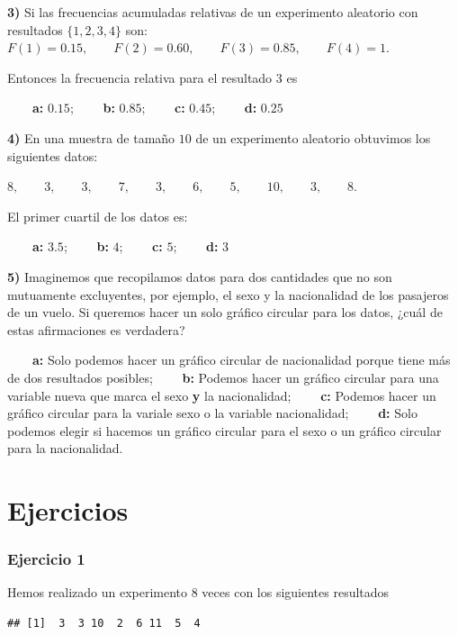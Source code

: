 \documentclass[
]{book}
\begin{document}
\textbf{3)} Si las frecuencias acumuladas relativas de un experimento aleatorio con resultados \(\{1,2,3,4\}\) son: \(F(1)=0.15, \qquad F(2)=0.60, \qquad F(3)=0.85, \qquad F(4)=1\).

Entonces la frecuencia relativa para el resultado \(3\) es

\textbf{\(\qquad\)a:} \(0.15\); \textbf{\(\qquad\)b:} \(0.85\); \textbf{\(\qquad\)c:} \(0.45\); \textbf{\(\qquad\)d:} \(0.25\)

\textbf{4)} En una muestra de tamaño \(10\) de un experimento aleatorio obtuvimos los siguientes datos:

\(8,\qquad 3,\qquad 3,\qquad 7,\qquad 3,\qquad 6,\qquad 5,\qquad 10,\qquad 3,\qquad 8\).

El primer cuartil de los datos es:

\textbf{\(\qquad\)a:} \(3.5\); \textbf{\(\qquad\)b:} \(4\); \textbf{\(\qquad\)c:} \(5\); \textbf{\(\qquad\)d:} \(3\)

\textbf{5)} Imaginemos que recopilamos datos para dos cantidades que no son mutuamente excluyentes, por ejemplo, el sexo y la nacionalidad de los pasajeros de un vuelo. Si queremos hacer un solo gráfico circular para los datos, ¿cuál de estas afirmaciones es verdadera?

\textbf{\(\qquad\)a:} Solo podemos hacer un gráfico circular de nacionalidad porque tiene más de dos resultados posibles; \textbf{\(\qquad\)b:} Podemos hacer un gráfico circular para una variable nueva que marca el sexo \textbf{y} la nacionalidad; \textbf{\(\qquad\)c:} Podemos hacer un gráfico circular para la variale sexo o la variable nacionalidad; \textbf{\(\qquad\)d:} Solo podemos elegir si hacemos un gráfico circular para el sexo o un gráfico circular para la nacionalidad.

\hypertarget{ejercicios}{%
\section{Ejercicios}\label{ejercicios}}

\hypertarget{ejercicio-1}{%
\subsubsection{Ejercicio 1}\label{ejercicio-1}}

Hemos realizado un experimento 8 veces con los siguientes resultados

\begin{verbatim}
## [1]  3  3 10  2  6 11  5  4
\end{verbatim}
\end{document}
